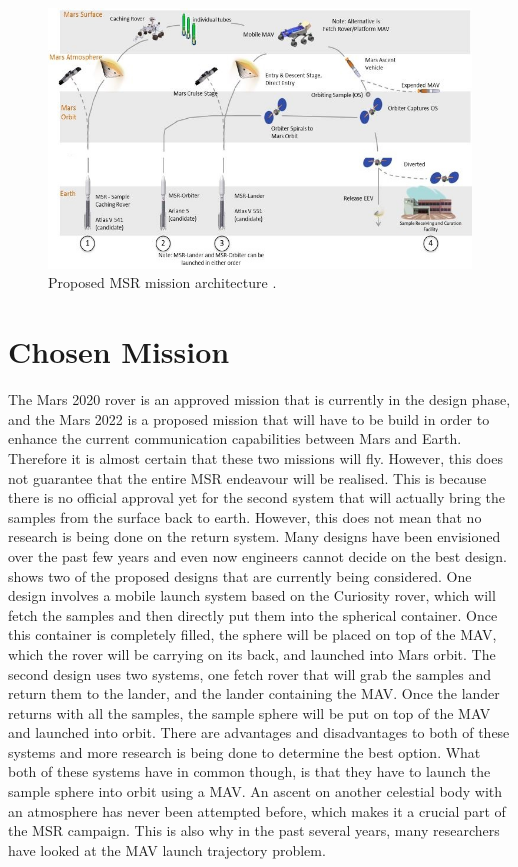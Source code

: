 \begin{figure}[H]
\centering
\includegraphics[width=0.75 \textwidth]{figures/heritage/proposedMSRmissionArchitecture_vaughan2016technology.jpg}
\caption{Proposed \ac{MSR} mission architecture \citep{vaughan2016technology}.}
\label{fig:proposedMSRmissionArchitecture_vaughan2016technology}
\end{figure}




\section{Chosen Mission}
\label{sec:chosenMission}
The Mars 2020 rover is an approved mission that is currently in the design phase, and the Mars 2022 is a proposed mission that will have to be build in order to enhance the current communication capabilities between Mars and Earth. Therefore it is almost certain that these two missions will fly. However, this does not guarantee that the entire \ac{MSR} endeavour will be realised. This is because there is no official approval yet for the second system that will actually bring the samples from the surface back to earth. However, this does not mean that no research is being done on the return system. Many designs have been envisioned over the past few years and even now engineers cannot decide on the best design. \cite{shotwell2016drivers} shows two of the proposed designs that are currently being considered. One design involves a mobile launch system based on the Curiosity rover, which will fetch the samples and then directly put them into the spherical container. Once this container is completely filled, the sphere will be placed on top of the \ac{MAV}, which the rover will be carrying on its back, and launched into Mars orbit. The second design uses two systems, one fetch rover that will grab the samples and return them to the lander, and the lander containing the \ac{MAV}. Once the lander returns with all the samples, the sample sphere will be put on top of the \ac{MAV} and launched into orbit. There are advantages and disadvantages to both of these systems and more research is being done to determine the best option. What both of these systems have in common though, is that they have to launch the sample sphere into orbit using a \ac{MAV}. An ascent on another celestial body with an atmosphere has never been attempted before, which makes it a crucial part of the \ac{MSR} campaign. This is also why in the past several years, many researchers have looked at the \ac{MAV} launch trajectory problem. 

